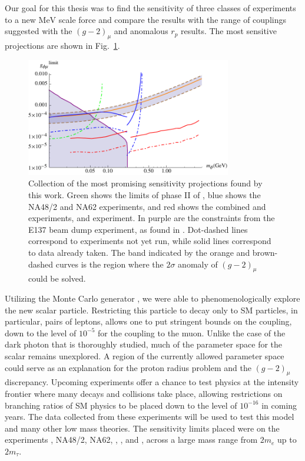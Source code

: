 \label{chapter:conclusion}

Our goal for this thesis was to find the sensitivity of three classes of experiments to a new $\textrm{MeV}$ scale force and compare the results with the range of couplings suggested with the $(g-2)_\mu$ and anomalous $r_p$ results.
The most sensitive projections are shown in Fig.~\ref{fig:best_limits}.

\begin{figure}[h]
    \centering
    \includegraphics[width=0.8\textwidth]{Figures/limits/best_limits}
    \caption{Collection of the most promising sensitivity projections found by this work. Green shows the limits of phase II of \mueee, blue shows the NA48/2 and NA62 experiments, and red shows the combined \belle and \babar experiments, and \belletwo experiment. In purple are the constraints from the E137 beam dump experiment, as found in \cite{Batell:2015unpub}. Dot-dashed lines correspond to experiments not yet run, while solid lines correspond to data already taken. The band indicated by the orange and brown-dashed curves is the region where the $2\sigma$ anomaly of $(g-2)_\mu$ could be solved.} 
    \label{fig:best_limits}
\end{figure}

Utilizing the Monte Carlo generator \madgraph, we were able to phenomenologically explore the new scalar particle.
Restricting this particle to decay only to SM particles, in particular, pairs of leptons, allows one to put stringent bounds on the coupling, down to the level of $10^{-5}$ for the coupling to the muon.
Unlike the case of the dark photon that is thoroughly studied, much of the parameter space for the scalar remains unexplored.
A region of the currently allowed parameter space could serve as an explanation for the proton radius problem and the $(g-2)_\mu$ discrepancy.
Upcoming experiments offer a chance to test physics at the intensity frontier where many decays and collisions take place, allowing restrictions on branching ratios of SM physics to be placed down to the level of $10^{-16}$ in coming years.
The data collected from these experiments will be used to test this model and many other low mass theories.
The sensitivity limits placed were on the experiments \mueee, NA48/2, NA62, \babar, \belle, and \belletwo, across a large mass range from $2m_e$ up to $2m_\tau$.


